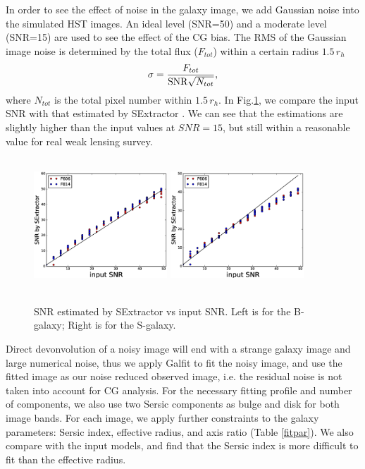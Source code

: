 \documentclass[useAMS,usenatbib]{mn2e}
\newcommand{\be}{\begin{equation}}
\newcommand{\ee}{\end{equation}}
\begin{document}
In order to see the effect of noise in the galaxy image, we add
Gaussian noise into the simulated HST images. An ideal level (SNR=50)
and a moderate level (SNR=15) are used to see the effect of the CG
bias. The RMS of the Gaussian image noise is determined by the total
flux ($F_{tot}$) within a certain radius $1.5\,r_h$
%
\be
\sigma = {F_{tot} \over {\rm SNR} \sqrt{N_{tot}} },
\ee
%
where $N_{tot}$ is the total pixel number within $1.5\,r_h$.  In
Fig.\ref{fig:ests2n}, we compare the input SNR with that estimated by
SExtractor \citep{1996A&AS..117..393B}. We can see that the
estimations are slightly higher than the input values at $SNR=15$, but
still within a reasonable value for real weak lensing survey.
%
\begin{figure}
\centerline{\includegraphics[height=5cm,width=5.0cm]{zs2ncB.eps}
\includegraphics[height=5cm,width=5.0cm]{zs2ncS.eps}}
\caption{SNR estimated by SExtractor vs input SNR. Left is for the
  B-galaxy; Right is for the S-galaxy.}
\label{fig:ests2n}
\end{figure}
%

Direct devonvolution of a noisy image will end with a strange galaxy
image and large numerical noise, thus we apply Galfit
\citep{2010AJ....139.2097P} to fit the noisy image, and use the fitted
image as our noise reduced observed image, i.e. the residual noise is
not taken into account for CG analysis. For the necessary fitting
profile and number of components, we also use two Sersic components as
bulge and disk for both image bands. For each image, we apply further
constraints to the galaxy parameters: Sersic index, effective radius,
and axis ratio (Table \ref{fitpar}). We also compare with the input
models, and find that the Sersic index is more difficult to fit than
the effective radius.
\end{document}
